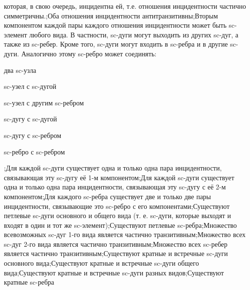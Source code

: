 \begin{SCn}
{	которая, в свою очередь, инцидентна ей, т.е. отношения инцидентности
	частично симметричны.;Оба отношения инцидентности антитранзитивны;Вторым компонентом каждой пары каждого отношения инцидентности
	может быть sc-элемент любого вида. В частности, sc-дуги могут
	выходить из других sc-дуг, а также из sc-ребер. Кроме того, sc-дуги могут входить в sc-ребра и в другие sc-дуги. Аналогично этому sc-ребро может соединять:
	\begin{scnitemize}
		\item два sc-узла
		\item sc-узел с sc-дугой
		\item sc-узел с другим sc-ребром
		\item sc-дугу с sc-дугой
		\item sc-дугу с sc-ребром
		\item sc-ребро с sc-ребром   
	\end{scnitemize};Для каждой sc-дуги существует одна и только одна пара
	инцидентности, связывающая эту sc-дугу её 1-м компонентом;Для каждой sc-дуги существует одна и только одна пара
	инцидентности, связывающая эту sc-дугу с её 2-м компонентом;Для каждого sc-ребра существует две и только две пары
	инцидентности, связывающие это sc-ребро с его компонентами;Существуют петлевые sc-дуги основного и общего вида (т. е. sc-дуги,
	которые выходят и входят в один и тот же sc-элемент);Существуют петлевые sc-ребра;Множество всевозможных sc-дуг 1-го вида является частично
	транзитивным;Множество всех sc-дуг 2-го вида является частично транзитивным;Множество всех sc-ребер является частично транзитивным;Существуют кратные и встречные sc-дуги основного вида;Существуют кратные и встречные sc-дуги общего вида;Существуют кратные и встречные sc-дуги разных видов;Существуют кратные sc-ребра
}
\filemodefalse
{}


\end{SCn}
